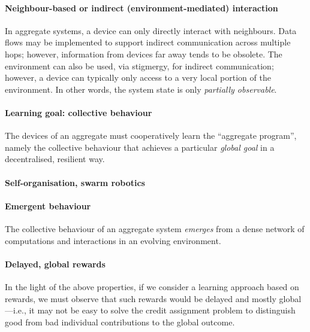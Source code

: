 \documentclass[
  twocolumn,
]{ceurart}
\begin{document}

\paragraph{Neighbour-based or indirect (environment-mediated) interaction}
%
In aggregate systems,
 a device can only directly interact with neighbours.
%
Data flows may be implemented
 to support indirect communication across multiple hops;
 however, information from devices far away tends to be obsolete.
%
The environment can also be used, via stigmergy,
 for indirect communication;
 however, a device can typically only access 
  to a very local portion of the environment.
%
In other words, the system state is only \emph{partially observable}.
%
\paragraph{Learning goal: collective behaviour}
%
The devices of an aggregate 
 must cooperatively learn the ``aggregate program'',
 namely the collective behaviour 
 that achieves a particular \emph{global goal}
 in a decentralised, resilient way.
%

\paragraph{Self-organisation, swarm robotics}
%

\paragraph{Emergent behaviour}
%
The collective behaviour of an aggregate system
 \emph{emerges} 
 from a dense network of computations and interactions
 in an evolving environment.
%

\paragraph{Delayed, global rewards}
%
In the light of the above properties,
 if we consider a learning approach based on rewards,
 we must observe that such rewards would be
 delayed and mostly global---i.e.,
 it may not be easy to solve the credit assignment problem
 to distinguish good from bad individual contributions
 to the global outcome.
\end{document}
